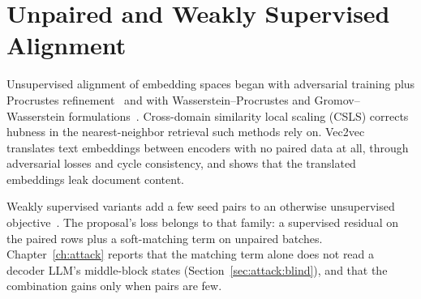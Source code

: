 \section{Unpaired and Weakly Supervised Alignment}\label{sec:lit:unpaired}

Unsupervised alignment of embedding spaces began with adversarial training plus Procrustes refinement~ and with Wasserstein--Procrustes and Gromov--Wasserstein formulations~. Cross-domain similarity local scaling (CSLS) corrects hubness in the nearest-neighbor retrieval such methods rely on. Vec2vec~ translates text embeddings between encoders with no paired data at all, through adversarial losses and cycle consistency, and shows that the translated embeddings leak document content.

Weakly supervised variants add a few seed pairs to an otherwise unsupervised objective~. The proposal's loss belongs to that family: a supervised residual on the paired rows plus a soft-matching term on unpaired batches. Chapter~\ref{ch:attack} reports that the matching term alone does not read a decoder LLM's middle-block states (Section~\ref{sec:attack:blind}), and that the combination gains only when pairs are few.

